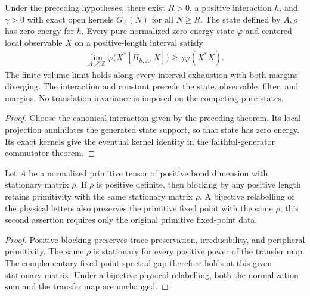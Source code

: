 \begin{lemma}
    \label{thm:faithful_generators_constructed_quasi_local_gap}
    \leanok
    Under the preceding hypotheses, there exist $R>0$, a positive interaction $h$, and $\gamma>0$ with exact open kernels $G_A(N)$ for
    all $N\geq R$. The state defined by $A,\rho$ has zero energy for $h$.
    Every pure normalized zero-energy state $\varphi$ and centered local
    observable $X$ on a positive-length interval satisfy
    \begin{align}
        \lim_{\Lambda\nearrow\mathbb Z}
        \varphi\bigl(X^*[H_{h,\Lambda},X]\bigr)
        \geq\gamma\varphi(X^*X).
    \end{align}
    The finite-volume limit holds along every interval exhaustion with both
    margins diverging. The interaction and constant precede the state,
    observable, filter, and margins. No translation invariance is imposed
    on the competing pure states.
\end{lemma}
\begin{proof}\leanok
    Choose the canonical interaction given by the preceding theorem.
    Its local projection annihilates the generated state support, so that
    state has zero energy. Its exact kernels give the eventual kernel
    identity in the faithful-generator commutator theorem.
\end{proof}

\begin{lemma}
    \label{thm:primitive_stationary_witness_transport}
    \leanok
    Let $A$ be a normalized primitive tensor of positive bond dimension with
    stationary matrix $\rho$. If $\rho$ is positive definite, then blocking by any positive length
    retains primitivity with the same stationary matrix $\rho$.
    A bijective relabelling of the physical letters also preserves the
    primitive fixed point with the same $\rho$; this second assertion requires
    only the original primitive fixed-point data.
\end{lemma}
\begin{proof}\leanok
    Positive blocking preserves trace preservation, irreducibility, and
    peripheral primitivity. The same $\rho$ is stationary for every
    positive power of the transfer map. The complementary fixed-point
    spectral gap therefore holds at this given stationary matrix.
    Under a bijective physical relabelling, both the normalization sum
    and the transfer map are unchanged.
\end{proof}

